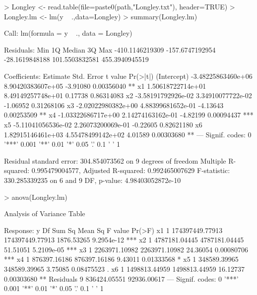 \documentclass[10pt]{article}
\begin{document}
\begin{Schunk}
\begin{Sinput}
> Longley <- read.table(file=paste0(path,"Longley.txt"), header=TRUE)
> Longley.lm <- lm(y ~ .,data=Longley)
> summary(Longley.lm)
\end{Sinput}
\begin{Soutput}
Call:
lm(formula = y ~ ., data = Longley)

Residuals:
            Min              1Q          Median              3Q             Max 
-410.1146219309 -157.6747192954  -28.1619848188  101.5503832581  455.3940945519 

Coefficients:
                      Estimate         Std. Error  t value   Pr(>|t|)    
(Intercept) -3.48225863460e+06  8.90420383607e+05 -3.91080 0.00356040 ** 
x1           1.50618722714e+01  8.49149257748e+01  0.17738 0.86314083    
x2          -3.58191792926e-02  3.34910077722e-02 -1.06952 0.31268106    
x3          -2.02022980382e+00  4.88399681652e-01 -4.13643 0.00253509 ** 
x4          -1.03322686717e+00  2.14274163162e-01 -4.82199 0.00094437 ***
x5          -5.11041056536e-02  2.26073200069e-01 -0.22605 0.82621180    
x6           1.82915146461e+03  4.55478499142e+02  4.01589 0.00303680 ** 
---
Signif. codes:  0 '***' 0.001 '**' 0.01 '*' 0.05 '.' 0.1 ' ' 1

Residual standard error: 304.854073562 on 9 degrees of freedom
Multiple R-squared:  0.995479004577,	Adjusted R-squared:  0.992465007629 
F-statistic: 330.285339235 on 6 and 9 DF,  p-value: 4.98403052872e-10
\end{Soutput}
\begin{Sinput}
> anova(Longley.lm)
\end{Sinput}
\begin{Soutput}
Analysis of Variance Table

Response: y
          Df          Sum Sq         Mean Sq    F value     Pr(>F)    
x1         1 174397449.77913 174397449.77913 1876.53265 9.2954e-12 ***
x2         1   4787181.04445   4787181.04445   51.51051 5.2109e-05 ***
x3         1   2263971.10982   2263971.10982   24.36054 0.00080706 ***
x4         1    876397.16186    876397.16186    9.43011 0.01333568 *  
x5         1    348589.39965    348589.39965    3.75085 0.08475523 .  
x6         1   1498813.44959   1498813.44959   16.12737 0.00303680 ** 
Residuals  9    836424.05551     92936.00617                          
---
Signif. codes:  0 '***' 0.001 '**' 0.01 '*' 0.05 '.' 0.1 ' ' 1
\end{Soutput}
\end{Schunk}
\end{document}
